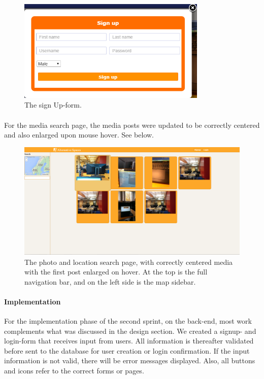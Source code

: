 \begin{figure}[ht!]
\centering
\includegraphics[width=90mm]{Sprint2/img/Sprint2-SignUpForm.png}
\caption{The sign Up-form. \label{overflow}}
\end{figure}

\paragraph{} For the media search page, the media posts were updated to be correctly centered and also enlarged upon mouse hover. See below. 

\begin{figure}[ht!]
\centering
\includegraphics[width={\linewidth}]{Sprint2/img/Sprint2-PhotoPage.png}
\caption{The photo and location search page, with correctly centered media with the first post enlarged on hover. At the top is the full navigation bar, and on the left side is the map sidebar. \label{overflow}}
\end{figure}



\paragraph{Implementation}
For the implementation phase of the second sprint, on the back-end, most work complements what was discussed in the design section. We created a signup- and login-form that receives input from users. All information is thereafter validated before sent to the database for user creation or login confirmation. If the input information is not valid, there will be error messages displayed. Also, all buttons and icons refer to the correct forms or pages. 

